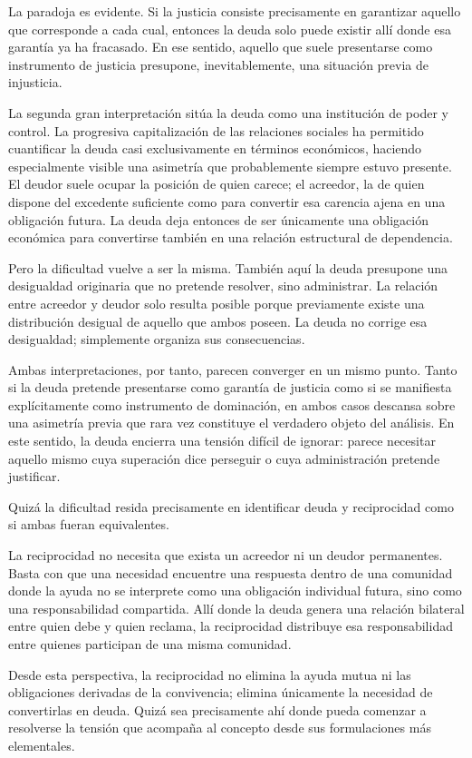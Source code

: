 \documentclass[11pt,a4paper]{article}
\begin{document}
La paradoja es evidente. Si la justicia consiste precisamente en garantizar aquello que corresponde a cada cual, entonces la deuda solo puede existir allí donde esa garantía ya ha fracasado. En ese sentido, aquello que suele presentarse como instrumento de justicia presupone, inevitablemente, una situación previa de injusticia.

La segunda gran interpretación sitúa la deuda como una institución de poder y control. La progresiva capitalización de las relaciones sociales ha permitido cuantificar la deuda casi exclusivamente en términos económicos, haciendo especialmente visible una asimetría que probablemente siempre estuvo presente. El deudor suele ocupar la posición de quien carece; el acreedor, la de quien dispone del excedente suficiente como para convertir esa carencia ajena en una obligación futura. La deuda deja entonces de ser únicamente una obligación económica para convertirse también en una relación estructural de dependencia.

Pero la dificultad vuelve a ser la misma. También aquí la deuda presupone una desigualdad originaria que no pretende resolver, sino administrar. La relación entre acreedor y deudor solo resulta posible porque previamente existe una distribución desigual de aquello que ambos poseen. La deuda no corrige esa desigualdad; simplemente organiza sus consecuencias.

Ambas interpretaciones, por tanto, parecen converger en un mismo punto. Tanto si la deuda pretende presentarse como garantía de justicia como si se manifiesta explícitamente como instrumento de dominación, en ambos casos descansa sobre una asimetría previa que rara vez constituye el verdadero objeto del análisis. En este sentido, la deuda encierra una tensión difícil de ignorar: parece necesitar aquello mismo cuya superación dice perseguir o cuya administración pretende justificar.

Quizá la dificultad resida precisamente en identificar deuda y reciprocidad como si ambas fueran equivalentes.

La reciprocidad no necesita que exista un acreedor ni un deudor permanentes. Basta con que una necesidad encuentre una respuesta dentro de una comunidad donde la ayuda no se interprete como una obligación individual futura, sino como una responsabilidad compartida. Allí donde la deuda genera una relación bilateral entre quien debe y quien reclama, la reciprocidad distribuye esa responsabilidad entre quienes participan de una misma comunidad.

Desde esta perspectiva, la reciprocidad no elimina la ayuda mutua ni las obligaciones derivadas de la convivencia; elimina únicamente la necesidad de convertirlas en deuda. Quizá sea precisamente ahí donde pueda comenzar a resolverse la tensión que acompaña al concepto desde sus formulaciones más elementales.
\end{document}
